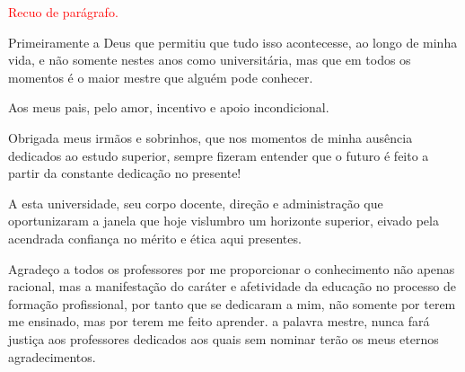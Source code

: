 \textcolor{red}{Recuo de parágrafo.}

Primeiramente a Deus que permitiu que tudo isso acontecesse, ao longo de minha vida, e não somente nestes anos como universitária, mas que em todos os momentos é o maior mestre que alguém pode conhecer.
	
Aos meus pais, pelo amor, incentivo e apoio incondicional.

Obrigada meus irmãos e sobrinhos, que nos momentos de minha ausência dedicados ao estudo superior, sempre fizeram entender que o futuro é feito a partir da constante dedicação no presente!

A esta universidade, seu corpo docente, direção e administração que oportunizaram a janela que hoje vislumbro um horizonte superior, eivado pela acendrada confiança no mérito e ética aqui presentes.

Agradeço a todos os professores por me proporcionar o conhecimento não apenas racional, mas a manifestação do caráter e afetividade da educação no processo de formação profissional, por tanto que se dedicaram a mim, não somente por terem me ensinado, mas por terem me feito aprender. a palavra mestre, nunca fará justiça aos professores dedicados aos quais sem nominar terão os meus eternos agradecimentos.